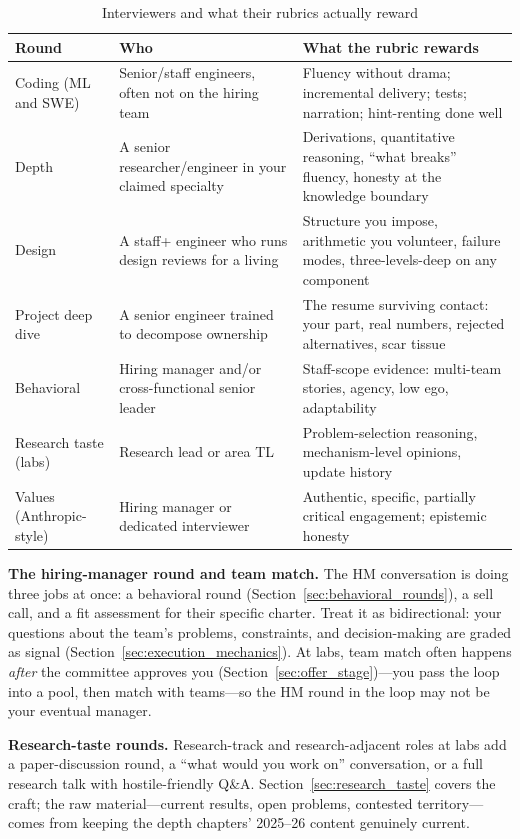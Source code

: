 \begin{table}[H]
\centering
\small
\caption{Interviewers and what their rubrics actually reward}
\label{tab:interviewer_rubrics}
\begin{tabularx}{\textwidth}{lXX}
\toprule
\textbf{Round} & \textbf{Who} & \textbf{What the rubric rewards} \\
\midrule
Coding (ML and SWE) & Senior/staff engineers, often not on the hiring team & Fluency without drama; incremental delivery; tests; narration; hint-renting done well \\
Depth & A senior researcher/engineer in your claimed specialty & Derivations, quantitative reasoning, ``what breaks'' fluency, honesty at the knowledge boundary \\
Design & A staff+ engineer who runs design reviews for a living & Structure you impose, arithmetic you volunteer, failure modes, three-levels-deep on any component \\
Project deep dive & A senior engineer trained to decompose ownership & The resume surviving contact: your part, real numbers, rejected alternatives, scar tissue \\
Behavioral & Hiring manager and/or cross-functional senior leader & Staff-scope evidence: multi-team stories, agency, low ego, adaptability \\
Research taste (labs) & Research lead or area TL & Problem-selection reasoning, mechanism-level opinions, update history \\
Values (Anthropic-style) & Hiring manager or dedicated interviewer & Authentic, specific, partially critical engagement; epistemic honesty \\
\bottomrule
\end{tabularx}
\end{table}

\textbf{The hiring-manager round and team match.} The HM conversation is doing three jobs at once: a behavioral round (Section~\ref{sec:behavioral_rounds}), a sell call, and a fit assessment for their specific charter. Treat it as bidirectional: your questions about the team's problems, constraints, and decision-making are graded as signal (Section~\ref{sec:execution_mechanics}). At labs, team match often happens \textit{after} the committee approves you (Section~\ref{sec:offer_stage})---you pass the loop into a pool, then match with teams---so the HM round in the loop may not be your eventual manager.

\textbf{Research-taste rounds.} Research-track and research-adjacent roles at labs add a paper-discussion round, a ``what would you work on'' conversation, or a full research talk with hostile-friendly Q\&A. Section~\ref{sec:research_taste} covers the craft; the raw material---current results, open problems, contested territory---comes from keeping the depth chapters' 2025--26 content genuinely current.

